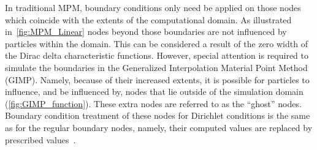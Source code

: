 In traditional MPM, boundary conditions only need be applied on those nodes 
which coincide with the extents of the computational domain. As  illustrated 
in~\cref{fig:MPM_Linear} nodes beyond those boundaries are not influenced by 
particles within the domain. This can be considered a result of the zero
width of the Dirac delta characteristic functions. However, special attention 
is required to simulate the boundaries in the Generalized Interpolation 
Material Point Method (GIMP). Namely, because of their increased extents, it is 
possible for particles to influence, and be influenced by, nodes that lie 
outside of the simulation domain (\cref{fig:GIMP_function}). These extra nodes 
are referred to as the ``ghost'' nodes. Boundary condition treatment of these 
nodes for Dirichlet conditions is the same as for the regular boundary
nodes, namely, their computed values are replaced by prescribed 
values~\citep{Steffen2008}.

